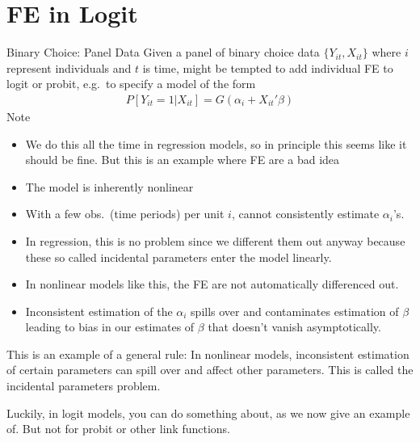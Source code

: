 \documentclass[aspectratio=169, handout]{beamer}
\begin{document}
\section{FE in Logit}

{\scriptsize
\begin{frame}{Binary Choice: Panel Data}
Given a panel of binary choice data $\{Y_{it},X_{it}\}$ where $i$
represent individuals and $t$ is time, might be tempted to
add \alert{individual FE} to logit or probit, e.g.\ to specify a model
of the form
\begin{align*}
  P[Y_{it}=1|X_{it}]
  =
  G(\alpha_i + X_{it}'\beta)
\end{align*}
Note
\begin{itemize}
  \item We do this all the time in regression models, so in principle
    this seems like it should be fine.
    But this is an example where FE are a \alert{bad idea}
  \item The model is inherently \alert{nonlinear}
  \item With a few obs.\ (time periods) per unit $i$, cannot
    consistently estimate $\alpha_i$'s.
  \item In regression, this is no problem since we different them out
    anyway because these so called \alert{incidental parameters} enter
    the model linearly.
  \item In nonlinear models like this, the FE are not automatically
    differenced out.
  \item Inconsistent estimation of the $\alpha_i$ spills over and
    \alert{contaminates} estimation of $\beta$ leading to bias in our
    estimates of $\beta$ that doesn't vanish asymptotically.
\end{itemize}
This is an example of a general rule:
In \alert{nonlinear} models, inconsistent estimation of certain
parameters can spill over and affect other parameters.
This is called the \alert{incidental parameters problem}.

Luckily, in logit models, you can do something about, as we now give an
example of.
But not for probit or other link functions.
\end{frame}
}
\end{document}
